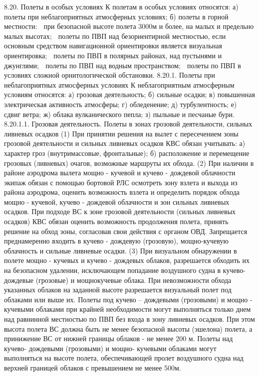 8.20.	Полеты в особых условиях 
К полетам в особых условиях относятся:
а)	полеты при неблагоприятных атмосферных условиях;
б)	полеты в горной местности:
	при безопасной высоте полета 3000м и более, на малых и предельно малых высотах;
	полеты по ПВП над безориентирной местностью, если основным средством навигационной ориентировки является визуальная ориентировка;
	полеты по ПВП в полярных районах, над пустынями и джунглями;
	полеты по ПВП над водным пространством;
	полеты по ПВП в условиях сложной орнитологической обстановки.
8.20.1.	Полеты при неблагоприятных атмосферных условиях
К неблагоприятным атмосферным условиям относятся:
а)	грозовая деятельность;
б)	сильные осадки;
в)	повышенная электрическая активность атмосферы;
г)	обледенение;
д)	турбулентность;
е)	сдвиг ветра;
ж)	облака вулканического пепла;
з)	пыльные и песчаные бури.
8.20.1.1.	Грозовая деятельность. Полеты в зонах грозовой деятельности, сильных ливневых осадков
(1) При принятии решения на вылет с пересечением зоны грозовой деятельности и сильных ливневых осадков КВС обязан учитывать:
а)	характер гроз (внутримассовые, фронтальные);
б)	расположение и перемещение грозовых (ливневых) очагов, возможные маршруты их обхода.
(2) При наличии в районе аэродрома вылета мощно - кучевой и кучево - дождевой облачности экипаж обязан с помощью бортовой РЛС осмотреть зону взлета и выхода из района аэродрома, оценить возможность взлета и определить порядок обхода мощно - кучевой, кучево - дождевой облачности и зон сильных ливневых осадков.
При подходе ВС к зоне грозовой деятельности (сильных ливневых осадков) КВС обязан оценить возможность продолжения полета, принять решение на обход зоны, согласовав свои действия с органом ОВД.
Запрещается преднамеренно входить в кучево - дождевую (грозовую), мощно-кучевую облачность и сильные ливневые осадки.
(3) При визуальном обнаружении в полете мощно - кучевых и кучево - дождевых облаков, разрешается обходить их на безопасном удалении, исключающем попадание воздушного судна в кучево-дождевые (грозовые) и мощнокучевые облака. При невозможности обхода указанных облаков на заданной высоте разрешается визуальный полет под облаками или выше их.
Полеты под кучево – дождевыми (грозовыми) и мощно - кучевыми облаками при крайней необходимости могут выполняться только днем над равнинной местностью по ПВП без входа в зону ливневых осадков. При этом высота полета ВС должна быть не менее безопасной высоты (эшелона) полета, а принижение ВС от нижней границы облаков - не менее 200 м.
Полеты над кучево- дождевыми (грозовыми) и мощно- кучевыми облаками могут выполняться на высоте полета, обеспечивающей пролет воздушного судна над верхней границей облаков с превышением не менее 500м.
